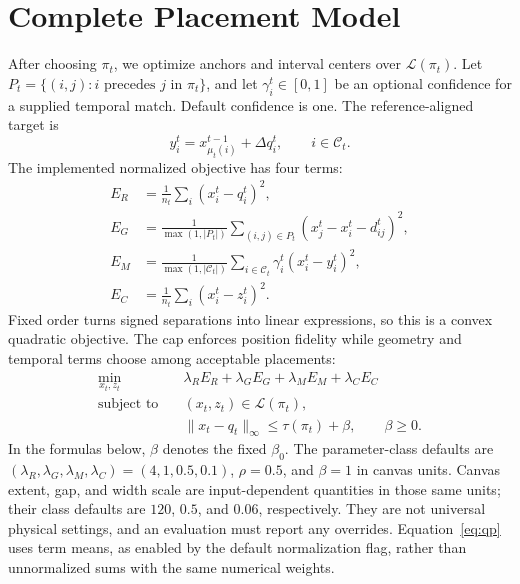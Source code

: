 \documentclass[10pt]{article}
\begin{document}
\section{Complete Placement Model}\label{sec:placement}
After choosing $\pi_t$, we optimize anchors and interval centers over $\mathcal{L}(\pi_t)$. Let $P_t=\{(i,j):i\text{ precedes }j\text{ in }\pi_t\}$, and let $\gamma_i^t\in[0,1]$ be an optional confidence for a supplied temporal match. Default confidence is one. The reference-aligned target is
\[
 y_i^t=x_{\mu_t(i)}^{t-1}+\Delta q_i^t,\qquad i\in\mathcal{C}_t.
\]
The implemented normalized objective has four terms:
\begin{equation}\label{eq:qpterms}
\begin{aligned}
 E_R&=\frac1{n_t}\sum_i(x_i^t-q_i^t)^2,\\
 E_G&=\frac1{\max(1,|P_t|)}\sum_{(i,j)\in P_t}
                 (x_j^t-x_i^t-d_{ij}^t)^2,\\
 E_M&=\frac1{\max(1,|\mathcal{C}_t|)}\sum_{i\in\mathcal{C}_t}
                     \gamma_i^t(x_i^t-y_i^t)^2,\\
 E_C&=\frac1{n_t}\sum_i(x_i^t-z_i^t)^2.
\end{aligned}
\end{equation}
Fixed order turns signed separations into linear expressions, so this is a convex quadratic objective. The cap enforces position fidelity while geometry and temporal terms choose among acceptable placements:
\begin{equation}\label{eq:qp}
\begin{aligned}
 \min_{x_t,z_t}\quad&\lambda_R E_R+\lambda_G E_G+
                       \lambda_M E_M+\lambda_C E_C\\
 \text{subject to}\quad&(x_t,z_t)\in\mathcal{L}(\pi_t),\\
 &\|x_t-q_t\|_\infty\le\tau(\pi_t)+\beta,\qquad\beta\ge0.
\end{aligned}
\end{equation}
In the formulas below, $\beta$ denotes the fixed $\beta_0$. The parameter-class defaults are $(\lambda_R,\lambda_G,\lambda_M,\lambda_C)=(4,1,0.5,0.1)$, $\rho=0.5$, and $\beta=1$ in canvas units. Canvas extent, gap, and width scale are input-dependent quantities in those same units; their class defaults are $120$, $0.5$, and $0.06$, respectively. They are not universal physical settings, and an evaluation must report any overrides. Equation~\ref{eq:qp} uses term means, as enabled by the default normalization flag, rather than unnormalized sums with the same numerical weights.
\end{document}
